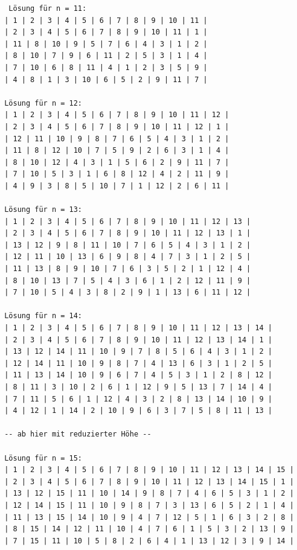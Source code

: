 \documentclass[a4paper, notitlepage, 12pt]{scrartcl}
\begin{document}
 \begin{center}
 \begin{Verbatim}
  Lösung für n = 11:
 | 1 | 2 | 3 | 4 | 5 | 6 | 7 | 8 | 9 | 10 | 11 | 
 | 2 | 3 | 4 | 5 | 6 | 7 | 8 | 9 | 10 | 11 | 1 | 
 | 11 | 8 | 10 | 9 | 5 | 7 | 6 | 4 | 3 | 1 | 2 | 
 | 8 | 10 | 7 | 9 | 6 | 11 | 2 | 5 | 3 | 1 | 4 | 
 | 7 | 10 | 6 | 8 | 11 | 4 | 1 | 2 | 3 | 5 | 9 | 
 | 4 | 8 | 1 | 3 | 10 | 6 | 5 | 2 | 9 | 11 | 7 | 
 
 Lösung für n = 12:
 | 1 | 2 | 3 | 4 | 5 | 6 | 7 | 8 | 9 | 10 | 11 | 12 | 
 | 2 | 3 | 4 | 5 | 6 | 7 | 8 | 9 | 10 | 11 | 12 | 1 | 
 | 12 | 11 | 10 | 9 | 8 | 7 | 6 | 5 | 4 | 3 | 1 | 2 | 
 | 11 | 8 | 12 | 10 | 7 | 5 | 9 | 2 | 6 | 3 | 1 | 4 | 
 | 8 | 10 | 12 | 4 | 3 | 1 | 5 | 6 | 2 | 9 | 11 | 7 | 
 | 7 | 10 | 5 | 3 | 1 | 6 | 8 | 12 | 4 | 2 | 11 | 9 | 
 | 4 | 9 | 3 | 8 | 5 | 10 | 7 | 1 | 12 | 2 | 6 | 11 | 
 
 Lösung für n = 13:
 | 1 | 2 | 3 | 4 | 5 | 6 | 7 | 8 | 9 | 10 | 11 | 12 | 13 | 
 | 2 | 3 | 4 | 5 | 6 | 7 | 8 | 9 | 10 | 11 | 12 | 13 | 1 | 
 | 13 | 12 | 9 | 8 | 11 | 10 | 7 | 6 | 5 | 4 | 3 | 1 | 2 | 
 | 12 | 11 | 10 | 13 | 6 | 9 | 8 | 4 | 7 | 3 | 1 | 2 | 5 | 
 | 11 | 13 | 8 | 9 | 10 | 7 | 6 | 3 | 5 | 2 | 1 | 12 | 4 | 
 | 8 | 10 | 13 | 7 | 5 | 4 | 3 | 6 | 1 | 2 | 12 | 11 | 9 | 
 | 7 | 10 | 5 | 4 | 3 | 8 | 2 | 9 | 1 | 13 | 6 | 11 | 12 | 
 
 Lösung für n = 14:
 | 1 | 2 | 3 | 4 | 5 | 6 | 7 | 8 | 9 | 10 | 11 | 12 | 13 | 14 | 
 | 2 | 3 | 4 | 5 | 6 | 7 | 8 | 9 | 10 | 11 | 12 | 13 | 14 | 1 | 
 | 13 | 12 | 14 | 11 | 10 | 9 | 7 | 8 | 5 | 6 | 4 | 3 | 1 | 2 | 
 | 12 | 14 | 11 | 10 | 9 | 8 | 7 | 4 | 13 | 6 | 3 | 1 | 2 | 5 | 
 | 11 | 13 | 14 | 10 | 9 | 6 | 7 | 4 | 5 | 3 | 1 | 2 | 8 | 12 | 
 | 8 | 11 | 3 | 10 | 2 | 6 | 1 | 12 | 9 | 5 | 13 | 7 | 14 | 4 | 
 | 7 | 11 | 5 | 6 | 1 | 12 | 4 | 3 | 2 | 8 | 13 | 14 | 10 | 9 | 
 | 4 | 12 | 1 | 14 | 2 | 10 | 9 | 6 | 3 | 7 | 5 | 8 | 11 | 13 | 
 
 -- ab hier mit reduzierter Höhe --
 
 Lösung für n = 15: 
 | 1 | 2 | 3 | 4 | 5 | 6 | 7 | 8 | 9 | 10 | 11 | 12 | 13 | 14 | 15 | 
 | 2 | 3 | 4 | 5 | 6 | 7 | 8 | 9 | 10 | 11 | 12 | 13 | 14 | 15 | 1 | 
 | 13 | 12 | 15 | 11 | 10 | 14 | 9 | 8 | 7 | 4 | 6 | 5 | 3 | 1 | 2 | 
 | 12 | 14 | 15 | 11 | 10 | 9 | 8 | 7 | 3 | 13 | 6 | 5 | 2 | 1 | 4 | 
 | 11 | 13 | 15 | 14 | 10 | 9 | 4 | 7 | 12 | 5 | 1 | 6 | 3 | 2 | 8 | 
 | 8 | 15 | 14 | 12 | 11 | 10 | 4 | 7 | 6 | 1 | 5 | 3 | 2 | 13 | 9 | 
 | 7 | 15 | 11 | 10 | 5 | 8 | 2 | 6 | 4 | 1 | 13 | 12 | 3 | 9 | 14 | 
 

\end{Verbatim}
\end{center}
\end{document}
